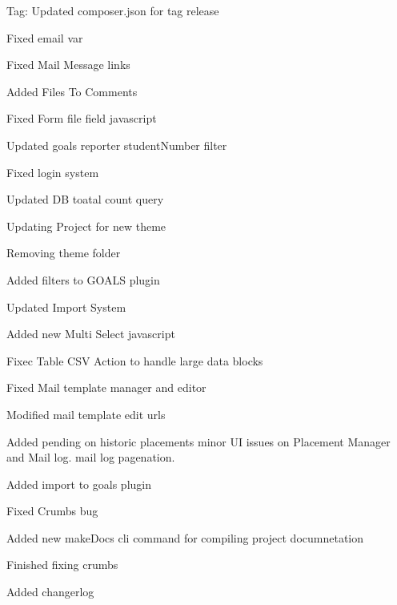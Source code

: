 \begin{DoxyItemize}
\item Tag\+: Updated composer.\+json for tag release
\item Fixed email var
\item Fixed Mail Message links
\item Added Files To Comments
\item Fixed Form file field javascript
\item Updated goals reporter student\+Number filter
\item Fixed login system
\item Updated D\+B toatal count query
\item Updating Project for new theme
\item Removing theme folder
\item Added filters to G\+O\+A\+L\+S plugin
\item Updated Import System
\item Added new Multi Select javascript
\item Fixec Table C\+S\+V Action to handle large data blocks
\item Fixed Mail template manager and editor
\item Modified mail template edit urls
\item Added pending on historic placements minor U\+I issues on Placement Manager and Mail log. mail log pagenation.
\item Added import to goals plugin
\item Fixed Crumbs bug
\item Added new make\+Docs cli command for compiling project documnetation
\item Finished fixing crumbs
\item Added changerlog 
\end{DoxyItemize}